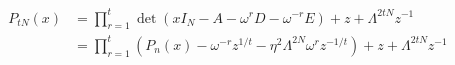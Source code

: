 \begin{equation}
 \begin{split}
P_{tN}(x)
 &= \prod_{r=1}^{t} \det \left( xI_{N} - A -  \omega^r D - \omega^{-r} E \right) + z + \Lambda^{2tN} z^{-1} \\
 &= \prod_{r=1}^{t}  \left( P_{n}(x) - \omega^{-r} z^{1/t}  - \eta^2 \Lambda^{2N} \omega^r z^{-1/t} \right) + z + \Lambda^{2tN} z^{-1}
 \end{split}
\label{PtNPN}
\end{equation}

